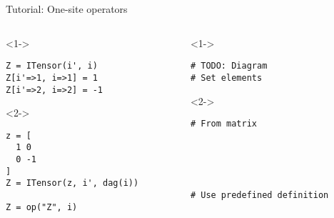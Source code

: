 \begin{frame}[fragile]{Tutorial: One-site operators}

\begin{columns}

\begin{column}{4.5cm}

\begin{onlyenv}<1->

\begin{lstlisting}[language=JuliaLocal, style=julia, basicstyle=\small]
Z = ITensor(i', i)
Z[i'=>1, i=>1] = 1
Z[i'=>2, i=>2] = -1
\end{lstlisting}

\end{onlyenv}

\begin{onlyenv}<2->

\begin{lstlisting}[language=JuliaLocal, style=julia, basicstyle=\small]
z = [
  1 0
  0 -1
]
Z = ITensor(z, i', dag(i))

Z = op("Z", i)
\end{lstlisting}

\end{onlyenv}

\end{column}

\begin{column}{4.5cm}

\begin{onlyenv}<1->

\begin{lstlisting}[style=julia, numbers=none, mathescape, basicstyle=\small]
# TODO: Diagram
# Set elements
 \end{lstlisting}

\end{onlyenv}

\begin{onlyenv}<2->

\begin{lstlisting}[style=julia, numbers=none, mathescape, basicstyle=\small]
# From matrix





# Use predefined definition
\end{lstlisting}

\end{onlyenv}

\end{column}

\end{columns}

\end{frame}
